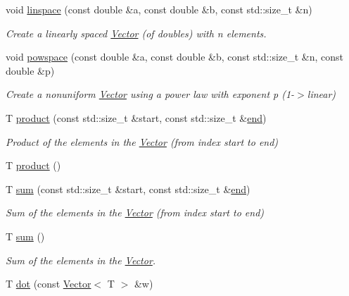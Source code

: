 \begin{DoxyCompactItemize}
void \hyperlink{classLuna_1_1Vector_a275847fc0bddea86c66651201a6db82e}{linspace} (const double \&a, const double \&b, const std\+::size\+\_\+t \&n)
\begin{DoxyCompactList}\small\item\em Create a linearly spaced \hyperlink{classLuna_1_1Vector}{Vector} (of doubles) with n elements. \end{DoxyCompactList}\item 
void \hyperlink{classLuna_1_1Vector_a8073a13aaee8bf6602a543d912193626}{powspace} (const double \&a, const double \&b, const std\+::size\+\_\+t \&n, const double \&p)
\begin{DoxyCompactList}\small\item\em Create a nonuniform \hyperlink{classLuna_1_1Vector}{Vector} using a power law with exponent p (1-\/$>$linear) \end{DoxyCompactList}\item 
T \hyperlink{classLuna_1_1Vector_a25e7062ee4ef547ac7ad54bd63605e60}{product} (const std\+::size\+\_\+t \&start, const std\+::size\+\_\+t \&\hyperlink{classLuna_1_1Vector_a94f0c4fd25cb841b21d7bf7be4d6004f}{end})
\begin{DoxyCompactList}\small\item\em Product of the elements in the \hyperlink{classLuna_1_1Vector}{Vector} (from index start to end) \end{DoxyCompactList}\item 
T \hyperlink{classLuna_1_1Vector_ac5b4435a746e0894b8b4caa893b53619}{product} ()
\item 
T \hyperlink{classLuna_1_1Vector_a2d8df886780b81d237c11fda4c310cab}{sum} (const std\+::size\+\_\+t \&start, const std\+::size\+\_\+t \&\hyperlink{classLuna_1_1Vector_a94f0c4fd25cb841b21d7bf7be4d6004f}{end})
\begin{DoxyCompactList}\small\item\em Sum of the elements in the \hyperlink{classLuna_1_1Vector}{Vector} (from index start to end) \end{DoxyCompactList}\item 
T \hyperlink{classLuna_1_1Vector_a3f9422b246093b153a55577a6ca97e26}{sum} ()
\begin{DoxyCompactList}\small\item\em Sum of the elements in the \hyperlink{classLuna_1_1Vector}{Vector}. \end{DoxyCompactList}\item 
T \hyperlink{classLuna_1_1Vector_a0c54499efcc61b644a88f59a07b68105}{dot} (const \hyperlink{classLuna_1_1Vector}{Vector}$<$ T $>$ \&w)

\end{DoxyCompactItemize}
